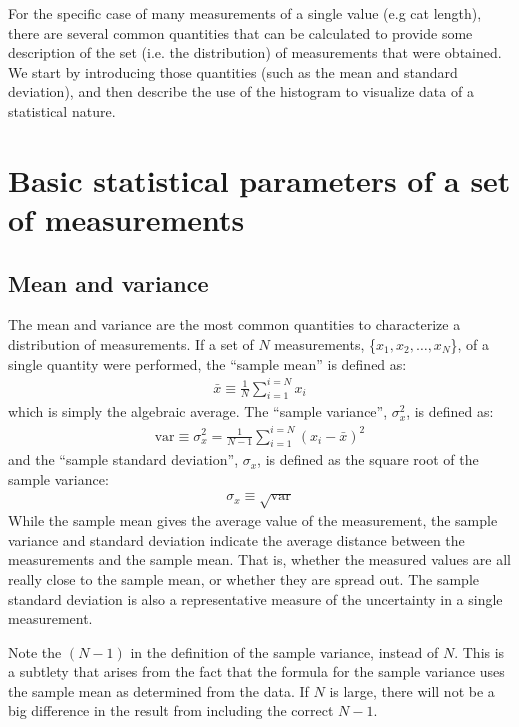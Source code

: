 For the specific case of many measurements of a single value (e.g cat length), there are several common quantities that can be calculated to provide some description of the set (i.e. the distribution) of measurements that were obtained. We start by introducing those quantities (such as the mean and standard deviation), and then describe the use of the histogram to visualize data of a statistical nature.

\section{Basic statistical parameters of a set of measurements}

\subsection{Mean and variance}

The mean and variance are the most common quantities to characterize a distribution of measurements. If a set of $N$ measurements, \{$x_1, x_2, \dots,x_N$\}, of a single quantity were performed, the ``sample mean'' is defined as:
\begin{align}
 \bar{x} \equiv \frac{1}{N} \sum_{i=1}^{i=N} x_i  
\end{align}
which is simply the algebraic average. The ``sample variance'', $\sigma_x^2$, is defined as:
\begin{align}
 \text{var}\equiv \sigma_x^2 = \frac{1}{N-1} \sum_{i=1}^{i=N} (x_i-\bar{x})^2 
\end{align}
and the ``sample standard deviation'', $\sigma_x$, is defined as the square root of the sample variance:
\begin{align}
 \sigma_x\equiv\sqrt{\text{var}}
\end{align}
While the sample mean gives the average value of the measurement, the sample variance and standard deviation indicate the average distance between the measurements and the sample mean. That is, whether the measured values are all really close to the sample mean, or whether they are spread out. The sample standard deviation is also a representative measure of the uncertainty in a single measurement. 

Note the $(N-1)$ in the definition of the sample variance, instead of $N$. This is a subtlety that arises from the fact that the formula for the sample variance uses the sample mean as determined from the data. If $N$ is large, there will not be a big difference in the result from including the correct $N-1$.

